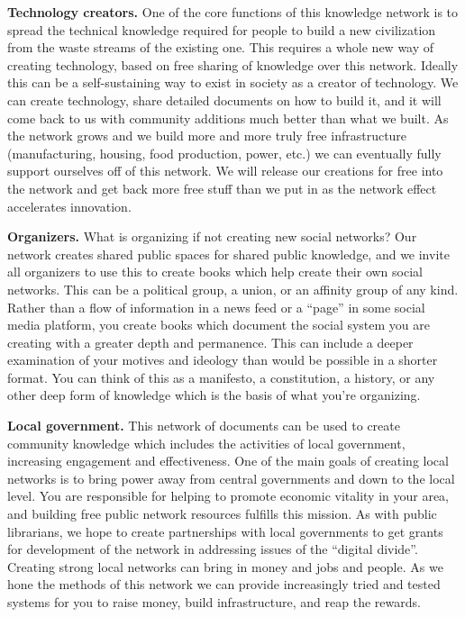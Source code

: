 \textbf{Technology creators.} One of the core functions of this
knowledge network is to spread the technical knowledge required for
people to build a new civilization from the waste streams of the
existing one. This requires a whole new way of creating technology,
based on free sharing of knowledge over this network. Ideally this can
be a self-sustaining way to exist in society as a creator of technology.
We can create technology, share detailed documents on how to build it,
and it will come back to us with community additions much better than
what we built. As the network grows and we build more and more truly
free infrastructure (manufacturing, housing, food production, power,
etc.) we can eventually fully support ourselves off of this network. We
will release our creations for free into the network and get back more
free stuff than we put in as the network effect accelerates innovation.

\textbf{Organizers.} What is organizing if not creating new social
networks? Our network creates shared public spaces for shared public
knowledge, and we invite all organizers to use this to create books
which help create their own social networks. This can be a political
group, a union, or an affinity group of any kind. Rather than a flow of
information in a news feed or a ``page'' in some social media platform,
you create books which document the social system you are creating with
a greater depth and permanence. This can include a deeper examination of
your motives and ideology than would be possible in a shorter format.
You can think of this as a manifesto, a constitution, a history, or any
other deep form of knowledge which is the basis of what you're
organizing.

\textbf{Local government.} This network of documents can be used to
create community knowledge which includes the activities of local
government, increasing engagement and effectiveness. One of the main
goals of creating local networks is to bring power away from central
governments and down to the local level. You are responsible for helping
to promote economic vitality in your area, and building free public
network resources fulfills this mission. As with public librarians, we
hope to create partnerships with local governments to get grants for
development of the network in addressing issues of the ``digital
divide''. Creating strong local networks can bring in money and jobs and
people. As we hone the methods of this network we can provide
increasingly tried and tested systems for you to raise money, build
infrastructure, and reap the rewards.

